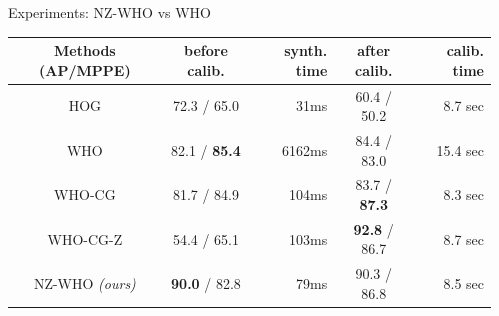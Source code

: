 \documentclass[serif,mathserif,final]{beamer}
\newcommand{\1}{\mathbb{I}} %
\begin{document}
\begin{frame}{}
\begin{columns}[t]
\begin{column}{0.24\linewidth}
    \end{column}%



    \begin{column}{0.23\linewidth}
      \begin{block}{Experiments: NZ-WHO vs WHO}
        \begin{table}[!htbp]
          \small
          \setlength{\tabcolsep}{1pt}
          \centering
          \begin{tabular}{|c|c|r|c|r|}
            \hline
            Methods (AP/MPPE) & before calib.  & synth. time & after calib. & calib. time \\
            \hline\hline
            HOG      & 72.3 / 65.0          &  31ms  & 60.4 / 50.2           & 8.7 sec \\ 
            WHO  & 82.1 / \textbf{85.4} &  6162ms& 84.4 / 83.0           & 15.4 sec\\
            WHO-CG                 & 81.7 / 84.9          &  104ms & 83.7 / \textbf{87.3}  & 8.3 sec \\
            WHO-CG-Z               & 54.4 / 65.1          &  103ms & \textbf{92.8} / 86.7  & 8.7 sec \\
            NZ-WHO {\em (ours)} & \textbf{90.0} / 82.8 &   79ms & 90.3 / 86.8           & 8.5 sec \\
            \hline
          \end{tabular}
          \label{tab:who_initializations}
        \end{table}
      \end{block}




\end{column}
\end{columns}
\end{frame}
\end{document}
